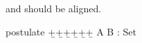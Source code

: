 \documentclass{article}
\begin{document}
 and  should be aligned.

\begin{code}
  postulate
    +̲+̲+̲+̲+̲+̲  A
            B : Set
\end{code}
\end{document}
